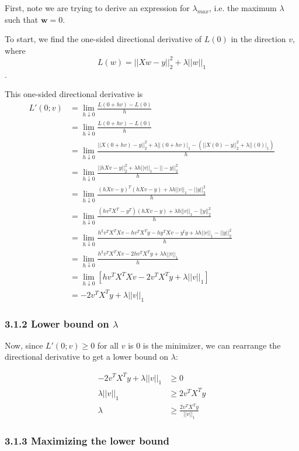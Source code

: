 \documentclass[paper=a4, fontsize=11pt]{scrartcl} %
\numberwithin{equation}{section} %
\numberwithin{figure}{section} %
\numberwithin{table}{section} %
\begin{document}
First, note we are trying to derive an expression for $\lambda_{max}$, i.e. the maximum $\lambda$ such that $\bm{w} = 0$.

To start, we find the one-sided directional derivative of $L(0)$ in the direction $v$, where
\[L(w) = ||Xw - y||_2^2 + \lambda ||w||_1\].

This one-sided directional derivative is
\begin{align*}
L'(0; v) &= \lim_{h \downarrow 0} \frac{L(0 + hv) - L(0)}{h} \\
	&= \lim_{h \downarrow 0} \frac{L(0 + hv) - L(0)}{h} \\
	&= \lim_{h \downarrow 0} \frac{||X(0 + hv) - y||_2^2 + \lambda ||(0 + hv)|_1 - (||X(0) - y||_2^2 + \lambda ||(0)|_1 )}{h}\\
	&= \lim_{h \downarrow 0} \frac{||hXv - y||_2^2 + \lambda h||v||_1 - ||-y||_2^2}{h}\\
	&= \lim_{h \downarrow 0} \frac{(hXv - y)^T(hXv - y) + \lambda h||v||_1 -  ||y||_2^2}{h}\\
	&= \lim_{h \downarrow 0} \frac{(hv^TX^T - y^T)(hXv - y) + \lambda h||v||_1 -  ||y||_2^2}{h}\\
	&= \lim_{h \downarrow 0} \frac{h^2v^TX^TXv - hv^TX^Ty - hy^TXv - y^ty + \lambda h||v||_1 -  ||y||_2^2}{h}\\
	&= \lim_{h \downarrow 0} \frac{h^2v^TX^TXv - 2hv^TX^Ty + \lambda h||v||_1}{h}\\
	&= \lim_{h \downarrow 0} \left[hv^TX^TXv - 2v^TX^Ty + \lambda ||v||_1\right]\\
	&= -2v^TX^Ty + \lambda ||v||_1
\end{align*}

\subsubsection*{3.1.2 Lower bound on $\lambda$}

Now, since $L'(0; v) \geq 0$ for all $v$ is 0 is the minimizer, we can rearrange the directional derivative to get a lower bound on $\lambda$:

\begin{align*}
-2v^TX^Ty + \lambda ||v||_1 &\geq 0 \\
\lambda ||v||_1 &\geq 2v^TX^Ty \\
\lambda &\geq \frac{2v^TX^Ty}{||v||_1}
\end{align*}

\subsubsection*{3.1.3 Maximizing the lower bound}
\end{document}
